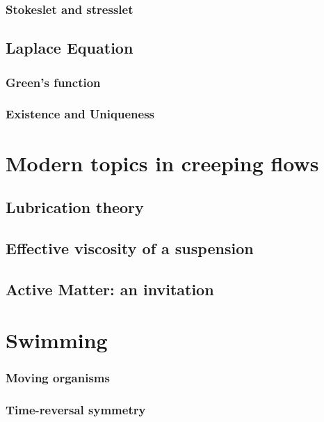 \documentclass{tufte-book} %
\begin{document}
\subsection{Stokeslet and stresslet}
\begin{subappendices}
\section{Laplace Equation}
\subsection{Green's function}
\subsection{Existence and Uniqueness}
\end{subappendices}
\chapter{Modern topics in creeping flows}
\section{Lubrication theory}
\section{Effective viscosity of a suspension}
\section{Active Matter: an invitation}
\chapter{Swimming}
\subsection{Moving organisms}
\subsection{Time-reversal symmetry}
\end{document}
